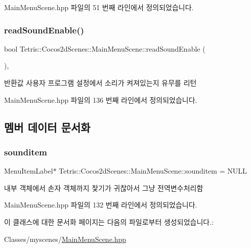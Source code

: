 Main\+Menu\+Scene.\+hpp 파일의 51 번째 라인에서 정의되었습니다.

\mbox{\label{class_tetris_1_1_cocos2d_scenes_1_1_main_menu_scene_a0454c0398dc84b0c8f9e1b3ff72da69d}} 
\subsubsection{\texorpdfstring{read\+Sound\+Enable()}{readSoundEnable()}}
{\footnotesize\ttfamily bool Tetris\+::\+Cocos2d\+Scenes\+::\+Main\+Menu\+Scene\+::read\+Sound\+Enable (\begin{DoxyParamCaption}{ }\end{DoxyParamCaption})\hspace{0.3cm}{\ttfamily [inline]}, {\ttfamily [protected]}}

\begin{DoxyReturn}{반환값}
사용자 프로그램 설정에서 소리가 켜져있는지 유무를 리턴 
\end{DoxyReturn}


Main\+Menu\+Scene.\+hpp 파일의 136 번째 라인에서 정의되었습니다.



\subsection{멤버 데이터 문서화}
\mbox{\label{class_tetris_1_1_cocos2d_scenes_1_1_main_menu_scene_a39d5adca64f40a97548344531ff019b8}} 
\subsubsection{\texorpdfstring{sounditem}{sounditem}}
{\footnotesize\ttfamily Menu\+Item\+Label$\ast$ Tetris\+::\+Cocos2d\+Scenes\+::\+Main\+Menu\+Scene\+::sounditem = N\+U\+LL\hspace{0.3cm}{\ttfamily [protected]}}



내부 객체에서 손자 객체까지 찿기가 귀찮아서 그냥 전역변수처리함 



Main\+Menu\+Scene.\+hpp 파일의 132 번째 라인에서 정의되었습니다.



이 클래스에 대한 문서화 페이지는 다음의 파일로부터 생성되었습니다.\+:\begin{DoxyCompactItemize}
\item 
Classes/myscenes/\hyperlink{_main_menu_scene_8hpp}{Main\+Menu\+Scene.\+hpp}\end{DoxyCompactItemize}
